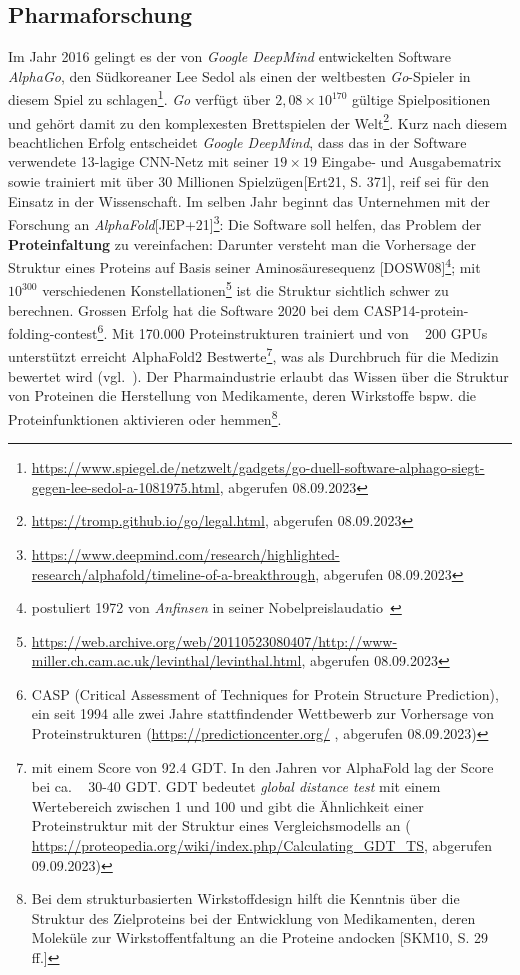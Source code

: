 \subsection{Pharmaforschung}
Im Jahr 2016 gelingt es der von \textit{Google DeepMind} entwickelten Software \textit{AlphaGo}, den Südkoreaner Lee Sedol als einen der weltbesten \textit{Go}-Spieler in diesem Spiel zu schlagen\footnote{
    \url{https://www.spiegel.de/netzwelt/gadgets/go-duell-software-alphago-siegt-gegen-lee-sedol-a-1081975.html}, abgerufen 08.09.2023
}. \textit{Go} verfügt über $2,08 \times 10^{170}$ gültige Spielpositionen und gehört damit zu den komplexesten Brettspielen der Welt\footnote{
    \url{https://tromp.github.io/go/legal.html}, abgerufen 08.09.2023
}. Kurz nach diesem beachtlichen Erfolg entscheidet \textit{Google DeepMind}, dass das in der Software verwendete 13-lagige CNN-Netz mit seiner $19 \times 19$ Eingabe- und Ausgabematrix sowie trainiert mit über 30 Millionen Spielzügen[Ert21, S. 371], reif sei für den Einsatz in der Wissenschaft. Im selben Jahr beginnt das Unternehmen mit der Forschung an \textit{AlphaFold}[JEP+21]\footnote{
    \url{https://www.deepmind.com/research/highlighted-research/alphafold/timeline-of-a-breakthrough}, abgerufen 08.09.2023
}: Die Software soll helfen, das Problem der \textbf{Proteinfaltung} zu vereinfachen: Darunter versteht man die Vorhersage der Struktur eines Proteins auf Basis seiner Aminosäuresequenz [DOSW08]\footnote{
    postuliert 1972 von \textit{Anfinsen} in seiner Nobelpreislaudatio~\cite[223]{Anf73}
}; mit $10^{300}$ verschiedenen Konstellationen\footnote{
    \url{https://web.archive.org/web/20110523080407/http://www-miller.ch.cam.ac.uk/levinthal/levinthal.html}, abgerufen 08.09.2023
} ist die Struktur sichtlich schwer zu berechnen.
Grossen Erfolg hat die Software 2020 bei dem CASP14-protein-folding-contest\footnote{
    CASP (Critical Assessment of Techniques for Protein Structure Prediction), ein seit 1994 alle zwei Jahre stattfindender Wettbewerb zur Vorhersage von Proteinstrukturen (\url{https://predictioncenter.org/} , abgerufen 08.09.2023)
}. Mit 170.000 Proteinstrukturen trainiert und von ~ 200 GPUs unterstützt erreicht AlphaFold2 Bestwerte\footnote{
    mit einem Score von 92.4 GDT. In den Jahren vor AlphaFold lag der Score bei ca. ~ 30-40 GDT. GDT bedeutet \textit{global distance test} mit einem Wertebereich zwischen 1 und 100 und gibt die Ähnlichkeit einer Proteinstruktur mit der Struktur eines Vergleichsmodells an (
    \url{https://proteopedia.org/wiki/index.php/Calculating_GDT_TS}, abgerufen 09.09.2023)
}, was als Durchbruch für die Medizin bewertet wird (vgl.~\cite[204]{Cal20}). Der Pharmaindustrie erlaubt das Wissen über die Struktur von Proteinen die Herstellung von Medikamente, deren Wirkstoffe bspw. die Proteinfunktionen aktivieren oder hemmen\footnote{
    Bei dem strukturbasierten Wirkstoffdesign hilft die Kenntnis über die Struktur des Zielproteins bei der Entwicklung von Medikamenten, deren Moleküle zur Wirkstoffentfaltung an die Proteine andocken [SKM10, S. 29 ff.]
}.


